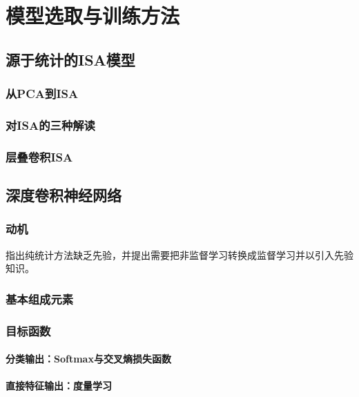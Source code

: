 
\chapter{模型选取与训练方法}


\section{源于统计的ISA模型}

\subsection{从PCA到ISA}

\subsection{对ISA的三种解读}

\subsection{层叠卷积ISA}


\section{深度卷积神经网络}

\subsection{动机}
指出纯统计方法缺乏先验，并提出需要把非监督学习转换成监督学习并以引入先验知识。

\subsection{基本组成元素}

\subsection{目标函数}
\subsubsection{分类输出：Softmax与交叉熵损失函数}
\subsubsection{直接特征输出：度量学习}


